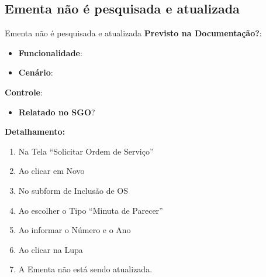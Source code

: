 \subsection{Ementa não é pesquisada e atualizada}
\begin{falha}[1]{Ementa não é pesquisada e atualizada}
	\textbf{Previsto na Documentação?}: \mschecksim
	\begin{itemize}
		\item \textbf{Funcionalidade}: \sosFd
		\item \textbf{Cenário}: \sosFdCc
	\end{itemize}
	
	\textbf{Controle}:
	\begin{itemize}
		\item \textbf{Relatado no SGO}? \mschecksim %
	\end{itemize}
	
	
	\tcblower
	
	\textbf{Detalhamento:}
	\begin{enumerate}
		\item Na Tela ``Solicitar Ordem de Serviço''
		
		\item Ao clicar em Novo
		
		\item No subform de Inclusão de OS
		
		\item Ao escolher o Tipo ``Minuta de Parecer''
		
		\item Ao informar o Número e o Ano
		
		\item Ao clicar na Lupa
		
		\item A Ementa não está sendo atualizada.
	\end{enumerate}
	
\end{falha}



